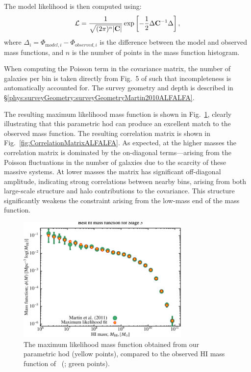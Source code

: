The model likelihood is then computed using:
\begin{equation}
 \mathcal{L} = {1 \over \sqrt{(2 \pi)^n |{\mathbf C}|}} \exp\left[ -{1\over 2} \Delta {\mathbf C}^{-1} \Delta \right],
\end{equation}
where $\Delta_i = \Phi_{{\mathrm model}, i} - \Phi_{{\mathrm observed}, i}$ is the difference between the model and observed mass functions, and $n$ is the number of points in the mass function histogram.

When computing the Poisson term in the covariance matrix, the number of galaxies per bin is taken directly from Fig.~5 of \cite{martin_arecibo_2010} such that incompleteness is automatically accounted for. The survey geometry and depth is described in \S\ref{phys:surveyGeometry:surveyGeometryMartin2010ALFALFA}.

The resulting maximum likelihood mass function is shown in Fig.~\ref{fig:MaximumLikelihoodMassFunctionHOD}, clearly illustrating that this parametric \gls{hod} can produce an excellent match to the observed mass function. The resulting correlation matrix is shown in Fig.~\ref{fig:CorrelationMatrixALFALFA}. As expected, at the higher masses the correlation matrix is dominated by the on-diagonal terms---arising from the Poisson fluctuations in the number of galaxies due to the scarcity of these massive systems. At lower masses the matrix has significant off-diagonal amplitude, indicating strong correlations between nearby bins, arising from both large-scale structure and halo contributions to the covariance. This structure significantly weakens the constraint arising from the low-mass end of the mass function.

\begin{figure}
 \includegraphics[width=85mm,trim=0mm 0mm 0mm 2.5mm,clip]{Plots/DataAnalysis/alfalfaHIMassFunctionBestFit.pdf}
 \caption{The maximum likelihood mass function obtained from our parametric \protect\gls{hod} (yellow points), compared to the observed HI mass function of \protect\citeauthor{martin_arecibo_2010}~(\citeyear{martin_arecibo_2010}; green points).}
 \label{fig:MaximumLikelihoodMassFunctionHOD}
\end{figure}

